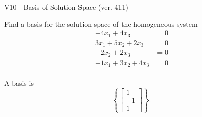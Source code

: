 \begin{exercise}
  \begin{exerciseTitle}V10 - Basis of Solution Space (ver. 411)\end{exerciseTitle}
  \begin{exerciseStatement}
    Find a basis for the solution space of the homogeneous system 
\begin{align*}
 -4 x_ 1 + 4 x_ 3 &= 0  \\ 
  3 x_ 1 + 5 x_ 2 + 2 x_ 3 &= 0  \\ 
  + 2 x_ 2 + 2 x_ 3 &= 0  \\ 
  -1 x_ 1 + 3 x_ 2 + 4 x_ 3 &= 0  \\ 
 \end{align*}


 
  \end{exerciseStatement}

  \begin{exerciseAnswer}
   A basis is   
\[\left\{\left[\begin{array}{c}
1 \\
-1 \\
1
\end{array}\right]\right\}.\]

  


  \end{exerciseAnswer}
\end{exercise}